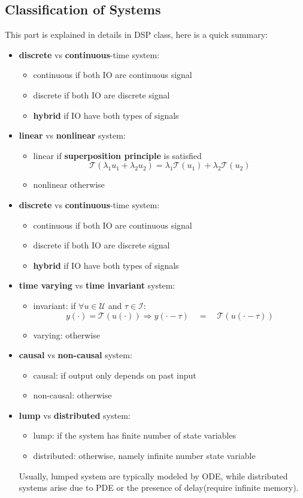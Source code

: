\documentclass[10pt,a4paper,oneside]{article}
\begin{document}
\subsection{Classification of Systems}
This part is explained in details in DSP class, here is a quick summary:
\begin{itemize}
	\item \textbf{discrete} vs \textbf{continuous}-time system: 
	\begin{itemize}
		\item continuous if both IO are continuous signal
		\item discrete if both IO are discrete signal
		\item \textbf{hybrid} if IO have both types of signals
	\end{itemize}
	\item \textbf{linear} vs \textbf{nonlinear} system: 
	\begin{itemize}
		\item linear if \textbf{superposition principle} is satisfied
		\[
		\mathcal{T}(\lambda_1 u_1 + \lambda_2 u_2) = \lambda_1 \mathcal{T} (u_1) +  \lambda_2 \mathcal{T}(u_2)
		\]
		\item nonlinear otherwise
	\end{itemize}
	\item \textbf{discrete} vs \textbf{continuous}-time system: 
	\begin{itemize}
		\item continuous if both IO are continuous signal
		\item discrete if both IO are discrete signal
		\item \textbf{hybrid} if IO have both types of signals
	\end{itemize}
	\item \textbf{time varying} vs \textbf{time invariant} system: 
	\begin{itemize}
		\item invariant: if $\forall u \in \mathcal{U}$ and $\tau \in \mathcal{I}$:
		\[
		y(\cdot) = \mathcal{T}(u(\cdot)) \Longrightarrow y(\cdot - \tau)  \quad = \quad \mathcal{T}(u(\cdot - \tau))
		\]
		\item varying: otherwise
	\end{itemize}
	\item \textbf{causal} vs \textbf{non-causal} system: 
	\begin{itemize}
		\item causal: if  output only depends on past input
		\item non-causal:  otherwise
	\end{itemize}
	\item \textbf{lump} vs \textbf{distributed} system: 
	\begin{itemize}
		\item lump: if the system has finite number of state variables
		\item distributed: otherwise, namely infinite number state variable
	\end{itemize}
	Usually, lumped system are typically modeled by ODE, while distributed systems arise due to PDE or the presence of delay(require infinite memory).
\end{itemize}
\end{document}

